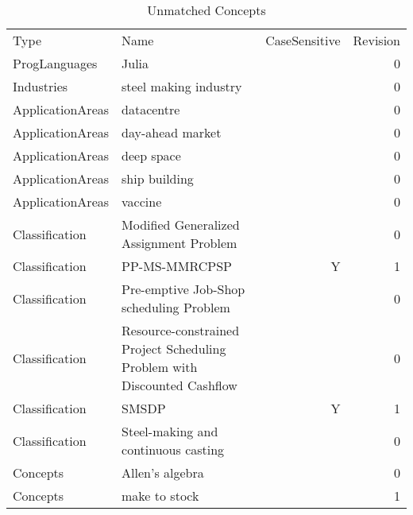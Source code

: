 {\scriptsize
\begin{longtable}{lp{10cm}rr}
\rowcolor{white}\caption{Unmatched Concepts}\\ \toprule
\rowcolor{white}Type & Name & CaseSensitive & Revision\\ \midrule
\endhead
\bottomrule
\endfoot
ProgLanguages & Julia &  & 0\\Industries & steel making industry &  & 0\\ApplicationAreas & datacentre &  & 0\\ApplicationAreas & day-ahead market &  & 0\\ApplicationAreas & deep space &  & 0\\ApplicationAreas & ship building &  & 0\\ApplicationAreas & vaccine &  & 0\\Classification & Modified Generalized Assignment Problem &  & 0\\Classification & PP-MS-MMRCPSP & Y & 1\\Classification & Pre-emptive Job-Shop scheduling Problem &  & 0\\Classification & Resource-constrained Project Scheduling Problem with Discounted Cashflow &  & 0\\Classification & SMSDP & Y & 1\\Classification & Steel-making and continuous casting &  & 0\\Concepts & Allen's algebra &  & 0\\Concepts & make to stock &  & 1\\\end{longtable}
}

